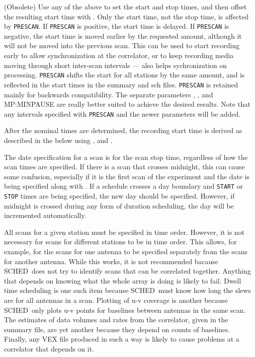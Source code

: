 \documentclass{report}
\newcommand{\schedb}{{\sc SCHED~}}
\begin{document}
\begin{list}{}{\parsep 0em  \itemsep 0em }
\item (Obsolete) Use any of the above to set the start and stop times,
and then offset the resulting start time with .  Only the start time, not the stop time, is
affected by {\tt PRESCAN}.  If {\tt PRESCAN} is positive, the start
time is delayed.  If {\tt PRESCAN} is negative, the start time is
moved earlier by the requested amount, although it will not be moved
into the previous scan.  This can be used to start recording early to
allow synchronization at the correlator, or to keep recording media
moving through short inter-scan intervals --- also helps
sychronization on processing.  {\tt PRESCAN} shifts the start for all
stations by the same amount, and is reflected in the start times in
the summary and sch files.  {\tt PRESCAN} is retained mainly for
backwards compatibility.  The separate parameters , , and
  {MP:MINPAUSE} are really better suited to
achieve the desired results. Note that any intervals specified with
{\tt PRESCAN} and the newer parameters will be added.

\end{list}

After the nominal times are determined, the recording start time is
derived as described in the  below using , and .


The date specification for a scan is for the scan stop time,
regardless of how the scan times are specified.  If there is a scan
that crosses midnight, this can cause some confusion, especially if it
is the first scan of the experiment and the date is being specified
along with .  If a schedule crosses a
day boundary and {\tt START} or {\tt STOP} times are being specified,
the new day should be specified.  However, if midnight is crossed
during any form of duration scheduling, the day will be incremented
automatically.

All scans for a given station must be specified in time order.
However, it is not necessary for scans for different stations to be in
time order.  This allows, for example, for the scans for one antenna
to be specified separately from the scans for another antenna.  While
this works, it is not recommended bacause \schedb does not try to
identify scans that can be correlated together.  Anything that depends
on knowing what the whole array is doing is likely to fail.  Dwell
time scheduling is one such item because \schedb must know how long
the slews are for all antennas in a scan.  Plotting of u-v coverage is
another because \schedb only plots u-v points for baselines between
antennas in the same scan.  The estimates of data volumes and rates
from the correlator, given in the summary file, are yet another
because they depend on counts of baselines.  Finally, any VEX file
produced in such a way is likely to cause problems at a correlator
that depends on it.
\end{document}
